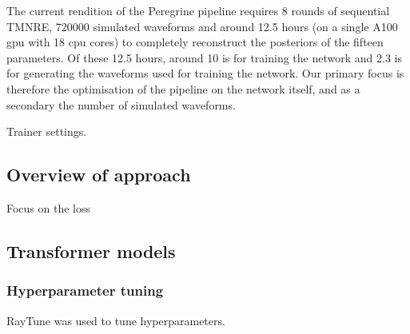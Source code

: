 
The current rendition of the Peregrine pipeline requires 8 rounds of sequential TMNRE, 720000 simulated waveforms and around 12.5 hours (on a single A100 gpu with 18 cpu cores) to completely reconstruct the posteriors of the fifteen parameters. Of these 12.5 hours, around 10 is for training the network and 2.3 is for generating the waveforms used for training the network. Our primary focus is therefore the optimisation of the pipeline on the network itself, and as a secondary the number of simulated waveforms.

Trainer settings.

\subsection{Overview of approach}

Focus on the loss 

\subsection{Transformer models}



\subsubsection{Hyperparameter tuning}

RayTune was used to tune hyperparameters. 

